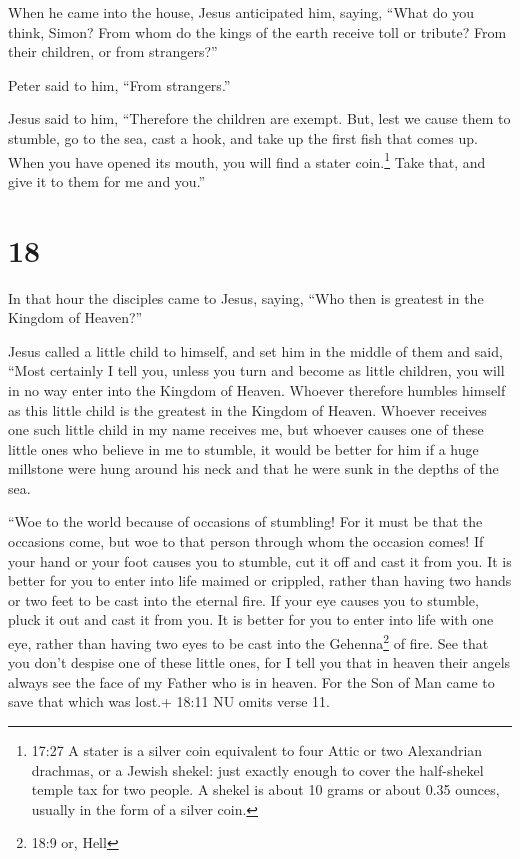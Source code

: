 When he came into the house, Jesus anticipated him, saying, ``What do
you think, Simon? From whom do the kings of the earth receive toll or
tribute? From their children, or from strangers?''

 Peter said to him, ``From strangers.''

Jesus said to him, ``Therefore the children are exempt. 
But, lest we cause them to stumble, go to the sea, cast a hook, and take
up the first fish that comes up. When you have opened its mouth, you
will find a stater coin.\footnote{17:27 A stater is a silver coin
  equivalent to four Attic or two Alexandrian drachmas, or a Jewish
  shekel: just exactly enough to cover the half-shekel temple tax for
  two people. A shekel is about 10 grams or about 0.35 ounces, usually
  in the form of a silver coin.} Take that, and give it to them for me
and you.''

\hypertarget{section-17}{%
\section{18}\label{section-17}}

 In that hour the disciples came to Jesus, saying, ``Who
then is greatest in the Kingdom of Heaven?''

 Jesus called a little child to himself, and set him in the
middle of them  and said, ``Most certainly I tell you,
unless you turn and become as little children, you will in no way enter
into the Kingdom of Heaven.  Whoever therefore humbles
himself as this little child is the greatest in the Kingdom of Heaven.
 Whoever receives one such little child in my name receives
me,  but whoever causes one of these little ones who believe
in me to stumble, it would be better for him if a huge millstone were
hung around his neck and that he were sunk in the depths of the sea.

 ``Woe to the world because of occasions of stumbling! For
it must be that the occasions come, but woe to that person through whom
the occasion comes!  If your hand or your foot causes you to
stumble, cut it off and cast it from you. It is better for you to enter
into life maimed or crippled, rather than having two hands or two feet
to be cast into the eternal fire.  If your eye causes you to
stumble, pluck it out and cast it from you. It is better for you to
enter into life with one eye, rather than having two eyes to be cast
into the Gehenna\footnote{18:9 or, Hell} of fire.  See that
you don't despise one of these little ones, for I tell you that in
heaven their angels always see the face of my Father who is in heaven.
 For the Son of Man came to save that which was lost.+
18:11 NU omits verse 11.

